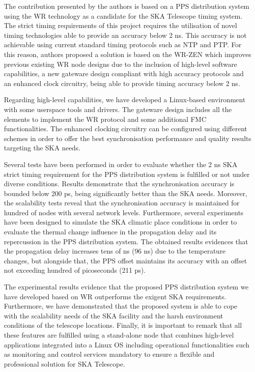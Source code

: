 The contribution presented by the authors is based on a PPS distribution system using the WR technology as a candidate for the SKA Telescope timing system. The strict timing requirements of this project requires the utilisation of novel timing technologies able to provide an accuracy below 2 ns. This accuracy is not achievable using current standard timing protocols such as NTP and PTP.
For this reason, authors proposed a solution is based on the WR-ZEN which improves previous existing WR node designs 
due to the inclusion of high-level software capabilities, a new gateware design compliant with high accuracy protocols and an enhanced clock circuitry, being able to provide timing accuracy below 2 ns.

Regarding high-level capabilities, we have developed a Linux-based environment with some userspace tools and drivers. The gateware design includes all the elements to implement the WR protocol and some additional FMC functionalities. The enhanced clocking circuitry can be configured using different schemes in order to offer the best synchronisation performance and quality results targeting the SKA needs. 

Several tests have been performed in order to evaluate whether the 2 ns SKA strict timing requirement for the PPS distribution system is fulfilled or not under diverse conditions.
Results demonstrate that the synchronisation accuracy is bounded below 200 ps, being significantly better than the SKA needs. Moreover, the scalability tests reveal that the synchronisation accuracy is maintained for hundred of nodes with several network levels. 
Furthermore, several experiments have been designed to simulate the SKA climatic place conditions 
in order to evaluate the thermal change influence in the propagation delay 
and its repercussion in the PPS distribution system. The obtained results evidences that the propagation delay increases tens of ns (96 ns) due to the temperature changes, but alongside that, the PPS offset maintains its accuracy with an offset not exceeding hundred of picoseconds (211 ps). 

The experimental results evidence that the proposed PPS distribution system we have developed based on WR outperforms the exigent SKA requirements. Furthermore, we have demonstrated that the proposed system is able to cope with the scalability needs of the SKA facility and the harsh environment conditions of the telescope locations. 
Finally, it is important to remark that all these features are fulfilled using a stand-alone node that combines high-level applications integrated into a Linux OS including operational functionalities such as monitoring and control services mandatory to  ensure a flexible and professional solution for SKA Telescope.



